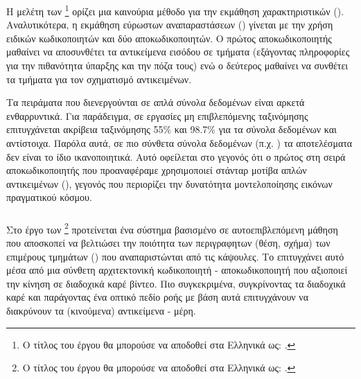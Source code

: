\subsubsection{}

Η μελέτη των  \footnote{Ο τίτλος του έργου θα μπορούσε να αποδοθεί στα Ελληνικά ως: .} \cite{kosiorek2019stacked} ορίζει μια καινούρια μέθοδο για την εκμάθηση χαρακτηριστικών (). Αναλυτικότερα, η εκμάθηση εύρωστων αναπαραστάσεων () γίνεται με την χρήση ειδικών κωδικοποιητών και δύο αποκωδικοποιητών. Ο πρώτος αποκωδικοποιητής μαθαίνει να αποσυνθέτει τα αντικείμενα εισόδου σε τμήματα (εξάγοντας πληροφορίες για την πιθανότητα ύπαρξης και την πόζα τους) ενώ ο δεύτερος μαθαίνει να συνθέτει τα τμήματα για τον σχηματισμό αντικειμένων.\par

Τα πειράματα που διενεργούνται σε απλά σύνολα δεδομένων είναι αρκετά ενθαρρυντικά. Για παράδειγμα, σε εργασίες μη επιβλεπόμενης ταξινόμησης επιτυγχάνεται ακρίβεια ταξινόμησης 55\% και 98.7\% για τα σύνολα δεδομένων  και  αντίστοιχα. Παρόλα αυτά, σε πιο σύνθετα σύνολα δεδομένων (π.χ. ) τα αποτελέσματα δεν είναι το ίδιο ικανοποιητικά. Αυτό οφείλεται στο γεγονός ότι ο πρώτος στη σειρά αποκωδικοποιητής που προαναφέραμε χρησιμοποιεί στάνταρ μοτίβα απλών αντικειμένων (), γεγονός που περιορίζει την δυνατότητα μοντελοποίησης εικόνων πραγματικού κόσμου.

\subsubsection{}

Στο έργο των  \footnote{Ο τίτλος του έργου θα μπορούσε να αποδοθεί στα Ελληνικά ως: .} \cite{pmlr-v139-sabour21a} προτείνεται ένα σύστημα βασισμένο σε αυτο\textendash επιβλεπόμενη μάθηση που αποσκοπεί να βελτιώσει την ποιότητα των περιγραφητων (θέση, σχήμα) των επιμέρους τμημάτων () που αναπαριστώνται από τις κάψουλες. Το επιτυγχάνει αυτό μέσα από μια σύνθετη αρχιτεκτονική κωδικοποιητή - αποκωδικοποιητή που αξιοποιεί την κίνηση σε διαδοχικά καρέ βίντεο. Πιο συγκεκριμένα, συγκρίνοντας τα διαδοχικά καρέ και παράγοντας ένα οπτικό πεδίο ροής με βάση αυτά επιτυγχάνουν να διακρύνουν τα (κινούμενα) αντικείμενα - μέρη.\par 

